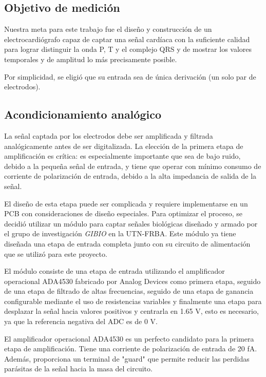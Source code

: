 \documentclass[conference]{IEEEtran}
\begin{document}
\subsection{Objetivo de medición}

Nuestra meta para este trabajo fue el diseño y construcción de un electrocardiógrafo
capaz de captar una señal cardíaca con la suficiente calidad para lograr distinguir
la onda P, T y el complejo QRS y de mostrar los valores temporales y de amplitud
lo más precisamente posible.

Por simplicidad, se eligió que su entrada sea de única derivación (un solo par de
electrodos).

\subsection{Acondicionamiento analógico}



La señal captada por los electrodos debe ser amplificada y filtrada analógicamente
antes de ser digitalizada. La elección de la primera etapa de amplificación es
crítica: es especialmente importante que sea de bajo ruido, debido a la pequeña
señal de entrada, y tiene que operar con mínimo consumo de corriente de polarización
de entrada, debido a la alta impedancia de salida de la señal.

El diseño de esta etapa puede ser complicada y requiere implementarse en un PCB 
con consideraciones de diseño especiales. Para optimizar el proceso, se decidió utilizar un módulo para captar señales biológicas diseñado y armado por el grupo
de investigación \textit{GIBIO} en la UTN-FRBA. Este módulo ya tiene diseñada una
etapa de entrada completa junto con su circuito de alimentación que se utilizó para este 
proyecto.

El módulo consiste de una etapa de entrada utilizando el amplificador operacional
ADA4530 fabricado por Analog Devices \cite{ada4530} como primera etapa, seguido de una
etapa de filtrado de altas frecuencias, seguido de una etapa de ganancia configurable
mediante el uso de resistencias variables y finalmente una etapa para desplazar la señal
hacia valores positivos y centrarla en 1.65 V, esto es necesario, ya que la referencia
negativa del ADC es de 0 V.

El amplificador operacional ADA4530  es un perfecto candidato para
la primera etapa de amplificación. Tiene una corriente de polarización de entrada de
20 fA. Además, proporciona un terminal de "guard" que permite reducir las perdidas
parásitas de la señal hacia la masa del circuito.
 
\end{document}
